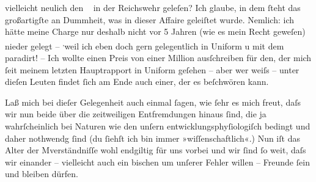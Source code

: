                     vielleicht neulich den  \label{K_L01134-1v}\label{K_L01134-1} in der
                    Reichswehr geleſen? Ich glaube, in dem{ }ſteht das großartigſte an Dummheit, was in dieser Affaire geleiſtet wurde.
                    Nemlich: ich hätte meine {\pb}Charge nur deshalb nicht vor 5 Jahren (wie es mein Recht geweſen) nieder
                    gelegt – \substVorne{}\textsuperscript{,}\substDazwischen{}weil\substHinten{} ich eben doch gern gelegentlich in Uniform \introOben{}u\introOben{}
                    mit dem \label{K_L01134-2v}\label{K_L01134-2} paradirt! – Ich wollte einen Preis von einer
                    Million ausſchreiben für den, der mich{ }ſeit meinem letzten Hauptrapport in
                    Uniform geſehen – aber wer weiſs – unter dieſen Leuten findet{ }ſich am Ende auch
                    einer, der es beſchwören kann.\pend
           
\pstart
           Laß mich bei dieſer Gelegenheit auch einmal{ }ſagen, wie{ }ſehr es {\pb}mich freut, daſs wir nun
                    beide über die \label{LL036-1v}zeitweiligen
                        Entfremdungen\label{LL036-1h} hinaus{ }ſind, die ja wahrſcheinlich bei Naturen wie
                    den unſern entwicklungsphyſiologiſch bedingt und daher nothwendg{ }ſind (du{ }ſiehſt
                    ich bin immer »wiſſenschaftlich«.) Nun iſt das Alter der Mverständniſſe wohl endgiltig für uns vorbei und wir{ }ſind{ }ſo weit, daſs
                    wir einander – vielleicht auch ein bischen um unſerer Fehler willen – Freunde{ }ſein und {\pb}bleiben dürfen.\pend
           
